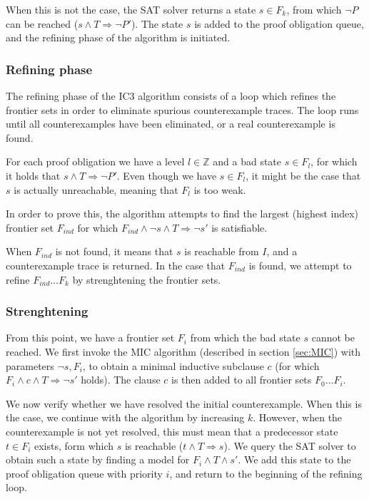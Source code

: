 \documentclass[a4paper]{article}
\begin{document}
When this is not the case, the SAT solver returns a state $s \in F_k$, from which $\lnot P$ can be reached ($s \land T \Rightarrow \lnot P'$). The state $s$ is added to the proof obligation queue, and the refining phase of the algorithm is initiated.

\subsubsection{Refining phase}
The refining phase of the IC3 algorithm consists of a loop which refines the frontier sets in order to eliminate spurious counterexample traces. The loop runs until all counterexamples have been eliminated, or a real counterexample is found.

For each proof obligation we have a level $l \in \mathbb{Z}$ and a bad state $s \in F_l$, for which it holds that $s \land T \Rightarrow \lnot P'$. Even though we have $s \in F_l$, it might be the case that $s$ is actually unreachable, meaning that $F_l$ is too weak.

In order to prove this, the algorithm attempts to find the largest (highest index) frontier set $F_{ind}$ for which $F_{ind} \land \lnot s \land T \Rightarrow \lnot s'$ is satisfiable.

When $F_{ind}$ is not found, it means that $s$ is reachable from $I$, and a counterexample trace is returned. In the case that $F_{ind}$ is found, we attempt to refine $F_{ind} \ldots F_k$ by strenghtening the frontier sets.

\subsubsection{Strenghtening}
\label{sec:ic3_str}
From this point, we have a frontier set $F_i$ from which the bad state $s$ cannot be reached. We first invoke the MIC algorithm (described in section \ref{sec:MIC}) with parameters $\lnot s, F_i$, to obtain a minimal inductive subclause $c$ (for which $F_i \land c \land T \Rightarrow \lnot s'$ holds). The clause $c$ is then added to all frontier sets $F_0 \ldots F_i$.

We now verify whether we have resolved the initial counterexample. When this is the case, we continue with the algorithm by increasing $k$. However, when the counterexample is not yet resolved, this must mean that a predecessor state $t \in F_i$ exists, form which $s$ is reachable ($t \land T \Rightarrow s$). We query the SAT solver to obtain such a state by finding a model for $F_{i} \land T \land s'$. We add this state to the proof obligation queue with priority $i$, and return to the beginning of the refining loop.
\end{document}
